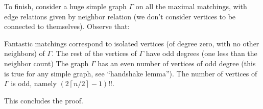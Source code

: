 \documentclass[11pt]{scrartcl}
\begin{document}
To finish, consider a huge simple graph $\Gamma$ on all the
maximal matchings, with edge relations given by neighbor relation
(we don't consider vertices to be connected to themselves).
Observe that:
\begin{itemize}
  \ii Fantastic matchings correspond to isolated vertices
  (of degree zero, with no other neighbors) of $\Gamma$.
  \ii The rest of the vertices of $\Gamma$ have odd degrees
  (one less than the neighbor count)
  \ii The graph $\Gamma$ has an even number of vertices of odd degree
  (this is true for any simple graph, see ``handshake lemma'').
  \ii The number of vertices of $\Gamma$ is odd,
  namely $\left( 2\left\lceil n/2 \right\rceil - 1 \right)!!$.
\end{itemize}
This concludes the proof.
\pagebreak
\end{document}

